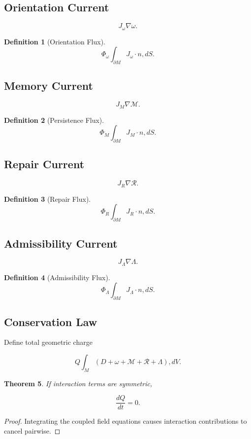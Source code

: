 \documentclass[12pt]{article}
\newtheorem{theorem}{Theorem}[section]
\newtheorem{definition}[theorem]{Definition}
\theoremstyle{remark}
\begin{document}
\subsection{Orientation Current}

\[
J_\omega
\nabla\omega.
\]

\begin{definition}[Orientation Flux]
\[
\Phi_\omega
\int_{\partial M}
J_\omega\cdot n
,dS.
\]
\end{definition}

\subsection{Memory Current}

\[
J_M
\nabla\mathcal M.
\]

\begin{definition}[Persistence Flux]
\[
\Phi_M
\int_{\partial M}
J_M\cdot n
,dS.
\]
\end{definition}

\subsection{Repair Current}

\[
J_R
\nabla\mathcal R.
\]

\begin{definition}[Repair Flux]
\[
\Phi_R
\int_{\partial M}
J_R\cdot n
,dS.
\]
\end{definition}

\subsection{Admissibility Current}

\[
J_\Lambda
\nabla\Lambda.
\]

\begin{definition}[Admissibility Flux]
\[
\Phi_\Lambda
\int_{\partial M}
J_\Lambda\cdot n
,dS.
\]
\end{definition}

\subsection{Conservation Law}

Define total geometric charge

\[
Q
\int_M
(D+\omega+\mathcal M+\mathcal R+\Lambda)
,dV.
\]

\begin{theorem}
If interaction terms are symmetric,

\[
\frac{dQ}{dt}=0.
\]
\end{theorem}
\begin{proof}
Integrating the coupled field equations causes interaction contributions to cancel pairwise.
\end{proof}
\end{document}
